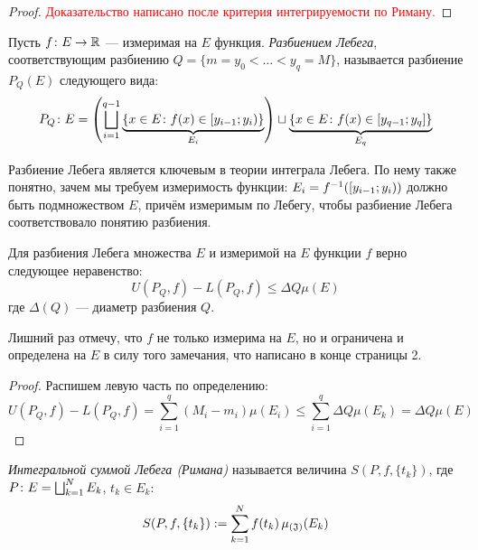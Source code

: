 \begin{proof}
	\textcolor{red}{Доказательство написано после критерия интегрируемости по Риману.}
\end{proof}

\begin{definition}
	Пусть $f \colon E \to \mathbb{R}$ --- измеримая на $E$ функция. \textit{Разбиением Лебега}, соответствующим разбиению $Q = \{m = y_0 < \ldots < y_q = M\}$, называется разбиение $P_Q(E)$ следующего вида:
	\[
		P_Q \colon E = \left(\bigsqcup_{i = 1}^{q - 1} \underbrace{\{x \in E \colon f(x) \in \left[y_{i - 1}; y_i\right)\}}_{E_i}\right) \sqcup \underbrace{\{x \in E \colon f(x) \in [y_{q - 1}; y_q]\}}_{E_q}
	\]
\end{definition}

\begin{note}
	Разбиение Лебега является ключевым в теории интеграла Лебега. По нему также понятно, зачем мы требуем измеримость функции: $E_i = f^{-1}(\left[y_{i - 1}; y_i\right))$ должно быть подмножеством $E$, причём измеримым по Лебегу, чтобы разбиение Лебега соответствовало понятию разбиения.
\end{note}

\begin{proposition} \label{uminl-le-dqe}
	Для разбиения Лебега множества $E$ и измеримой на $E$ функции $f$ верно следующее неравенство:
	\[
		U(P_Q, f) - L(P_Q, f) \le \Delta Q \mu(E)
	\]
	где $\Delta(Q)$ --- диаметр разбиения $Q$.
\end{proposition}

\begin{anote}
	Лишний раз отмечу, что $f$ не только измерима на $E$, но и ограничена и определена на $E$ в силу того замечания, что написано в конце страницы 2.
\end{anote}

\begin{proof}
	Распишем левую часть по определению:
	\[
		U(P_Q, f) - L(P_Q, f) = \sum_{i = 1}^q (M_i - m_i)\mu(E_i) \le \sum_{i = 1}^q \Delta Q\mu(E_k) = \Delta Q \mu(E)
	\]
\end{proof}

\begin{definition}
	\textit{Интегральной суммой Лебега (Римана)} называется величина $S(P, f, \{t_k\})$, где $P \colon E = \bigsqcup_{k = 1}^N E_k$, $t_k \in E_k$:
	\[
		S(P, f, \{t_k\}) := \sum_{k = 1}^N f(t_k) \operatorname{\mu_{(\mathfrak{J})}}(E_k)
	\]
\end{definition}

